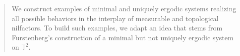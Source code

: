 \documentclass[12pt]{amsart}
\theoremstyle{definition}
\theoremstyle{plain}
\theoremstyle{definition}
\numberwithin{equation}{section}
\begin{document}
\begin{abstract}
We construct examples of minimal and uniquely ergodic systems realizing all possible behaviors in the interplay of measurable and topological nilfactors. To build such examples, we adapt an idea that stems from Furstenberg's construction of a minimal but not uniquely ergodic system on $\mathbb{T}^2$.






\end{abstract}
\end{document}

